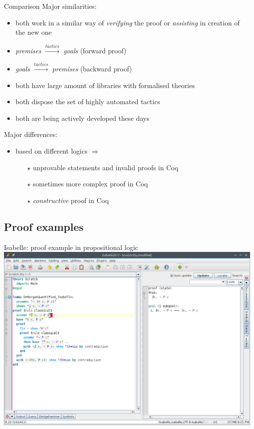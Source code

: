 \documentclass[aspectratio=169, 12pt, fleqn]{beamer}
\begin{document}
\begin{frame}{Comparison}
\textcolor{dkblue}{Major similarities:}
\begin{itemize}
  \item both work in a similar way of \textit{verifying} the proof or \textit{assisting} in creation of the new one
  \item \textit{premises} $\xrightarrow{tactics}$ \textit{goals} (forward proof)
  \item \textit{goals} $\xrightarrow{tactics}$ \textit{premises} (backward proof)
  \item both have large amount of libraries with formalised theories
  \item both dispose the set of highly automated tactics
  \item both are being actively developed these days
\end{itemize}

\vspace{10pt}
\textcolor{dkblue}{Major differences:}
\begin{itemize}
  \item based on different logics $\Rightarrow$
  \begin{itemize}
    \item[$\star$] unprovable statements and invalid proofs in Coq
    \item[$\star$] sometimes more complex proof in Coq
    \item[$\star$] \textit{constructive} proof in Coq
    
  \end{itemize}
\end{itemize}

\end{frame}


\subsection{Proof examples}

\begin{frame}
{Isabelle: proof example in propositional logic}
\includegraphics[scale=0.39]{img/isabelle_morgan.png}
\end{frame}
\end{document}

